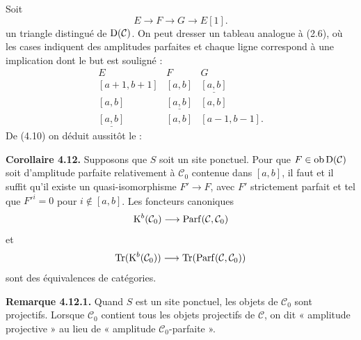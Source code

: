 \documentclass[11pt]{article}
\newcommand{\Parf}{\operatorname{Parf}}
\begin{document}
Soit
\[
  E\longrightarrow F\longrightarrow G\longrightarrow E[1].
\]
un triangle distingué de \(\Dpx(\mathcal C)\). On peut dresser un tableau analogue à (2.6), où les cases indiquent des amplitudes parfaites et chaque ligne correspond à une implication dont le but est souligné :
\[
\begin{array}{ccc}
E&F&G\\[0.3em]
{}[a+1,b+1]&{}[a,b]&\underline{[a,b]}\\
{}[a,b]&\underline{[a,b]}&{}[a,b]\\
\underline{[a,b]}&{}[a,b]&{}[a-1,b-1].
\end{array}
\]
De (4.10) on déduit aussitôt le :

\textbf{Corollaire 4.12.} Supposons que \(S\) soit un site ponctuel. Pour que \(F\in\Ob\Dpx(\mathcal C)\) soit d'amplitude parfaite relativement à \(\mathcal C_0\) contenue dans \([a,b]\), il faut et il suffit qu'il existe un quasi-isomorphisme \(F'\to F\), avec \(F'\) strictement parfait et tel que \(F'^i=0\) pour \(i\notin[a,b]\). Les foncteurs canoniques
\[
  \Kpx^b(\mathcal C_0)\longrightarrow\Parf(\mathcal C,\mathcal C_0)
\]
et
\[
  \Tr(\Kpx^b(\mathcal C_0))\longrightarrow\Tr(\Parf(\mathcal C,\mathcal C_0))
\]
sont des équivalences de catégories.

\textbf{Remarque 4.12.1.} Quand \(S\) est un site ponctuel, les objets de \(\mathcal C_0\) sont projectifs. Lorsque \(\mathcal C_0\) contient tous les objets projectifs de \(\mathcal C\), on dit « amplitude projective » au lieu de « amplitude \(\mathcal C_0\)-parfaite ».



\providecommand{\Cpx}{\mathrm C}
\providecommand{\Kpx}{\mathrm K}
\providecommand{\Dpx}{\mathrm D}
\providecommand{\Ho}{\mathrm H}
\providecommand{\Ob}{\operatorname{ob}}
\providecommand{\qis}{\xrightarrow{\sim}}
\providecommand{\RHom}{\mathrm R\!\Hom}
\providecommand{\Ext}{\operatorname{Ext}}
\providecommand{\Hom}{\operatorname{Hom}}
\providecommand{\Tr}{\operatorname{Tr}}

\providecommand{\Add}{\operatorname{Add}}
\providecommand{\Cart}{\operatorname{Cart}}
\providecommand{\perfamp}{\operatorname{perf.amp}}
\providecommand{\perfdim}{\operatorname{perf.dim}}
\providecommand{\toramp}{\operatorname{tor.amp}}
\providecommand{\torf}{\operatorname{torf}}
\providecommand{\injf}{\operatorname{injf}}
\providecommand{\rg}{\operatorname{rg}}
\providecommand{\is}{\mathrm{is}}
\providecommand{\Mod}{\operatorname{Mod}}
\end{document}
